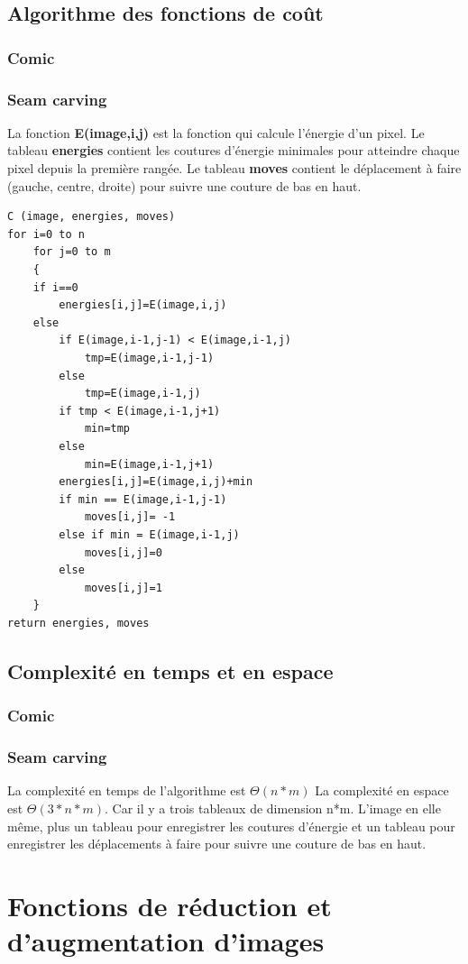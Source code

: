 \documentclass[10pt]{article}
\begin{document}
\subsection{Algorithme des fonctions de coût}
\subsubsection{Comic}
\subsubsection{Seam carving}
La fonction\textbf{ E(image,i,j)} est la fonction qui calcule l'énergie d'un pixel. Le tableau \textbf{energies} contient les coutures d'énergie minimales pour atteindre chaque pixel depuis la première rangée. Le tableau \textbf{moves} contient le déplacement à faire (gauche, centre, droite) pour suivre une couture de bas en haut. 
\begin{lstlisting}[frame=single]
C (image, energies, moves)
for i=0 to n
	for j=0 to m
	{
	if i==0
		energies[i,j]=E(image,i,j)
	else
		if E(image,i-1,j-1) < E(image,i-1,j)
			tmp=E(image,i-1,j-1)
		else
			tmp=E(image,i-1,j)
		if tmp < E(image,i-1,j+1)
			min=tmp
		else
			min=E(image,i-1,j+1)
		energies[i,j]=E(image,i,j)+min
		if min == E(image,i-1,j-1)			
			moves[i,j]= -1
		else if min = E(image,i-1,j)
			moves[i,j]=0
		else
			moves[i,j]=1
	}
return energies, moves
\end{lstlisting}

\subsection{Complexité en temps et en espace}
\subsubsection{Comic}
\subsubsection{Seam carving}
La complexité en temps de l'algorithme est $\Theta(n*m)$
La complexité en espace est $\Theta(3*n*m)$. Car il y a trois tableaux de dimension n*m. L'image en elle même, plus un tableau pour enregistrer les coutures d'énergie et un tableau pour enregistrer les déplacements à faire pour suivre une couture de bas en haut.

\section{Fonctions de réduction et d'augmentation d'images}
\end{document}
